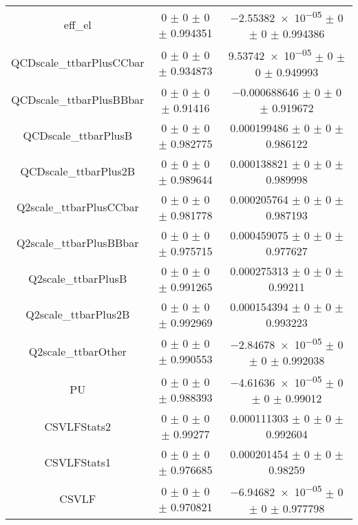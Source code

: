 \begin{table}
\begin{tabular}{ccc}
eff\_el & \num{0} $\pm$ \num{0} $\pm$ \num{0} $\pm$ \num{0.994351} & \num{-2.55382e-05} $\pm$ \num{0} $\pm$ \num{0} $\pm$ \num{0.994386}\\
QCDscale\_ttbarPlusCCbar & \num{0} $\pm$ \num{0} $\pm$ \num{0} $\pm$ \num{0.934873} & \num{9.53742e-05} $\pm$ \num{0} $\pm$ \num{0} $\pm$ \num{0.949993}\\
QCDscale\_ttbarPlusBBbar & \num{0} $\pm$ \num{0} $\pm$ \num{0} $\pm$ \num{0.91416} & \num{-0.000688646} $\pm$ \num{0} $\pm$ \num{0} $\pm$ \num{0.919672}\\
QCDscale\_ttbarPlusB & \num{0} $\pm$ \num{0} $\pm$ \num{0} $\pm$ \num{0.982775} & \num{0.000199486} $\pm$ \num{0} $\pm$ \num{0} $\pm$ \num{0.986122}\\
QCDscale\_ttbarPlus2B & \num{0} $\pm$ \num{0} $\pm$ \num{0} $\pm$ \num{0.989644} & \num{0.000138821} $\pm$ \num{0} $\pm$ \num{0} $\pm$ \num{0.989998}\\
Q2scale\_ttbarPlusCCbar & \num{0} $\pm$ \num{0} $\pm$ \num{0} $\pm$ \num{0.981778} & \num{0.000205764} $\pm$ \num{0} $\pm$ \num{0} $\pm$ \num{0.987193}\\
Q2scale\_ttbarPlusBBbar & \num{0} $\pm$ \num{0} $\pm$ \num{0} $\pm$ \num{0.975715} & \num{0.000459075} $\pm$ \num{0} $\pm$ \num{0} $\pm$ \num{0.977627}\\
Q2scale\_ttbarPlusB & \num{0} $\pm$ \num{0} $\pm$ \num{0} $\pm$ \num{0.991265} & \num{0.000275313} $\pm$ \num{0} $\pm$ \num{0} $\pm$ \num{0.99211}\\
Q2scale\_ttbarPlus2B & \num{0} $\pm$ \num{0} $\pm$ \num{0} $\pm$ \num{0.992969} & \num{0.000154394} $\pm$ \num{0} $\pm$ \num{0} $\pm$ \num{0.993223}\\
Q2scale\_ttbarOther & \num{0} $\pm$ \num{0} $\pm$ \num{0} $\pm$ \num{0.990553} & \num{-2.84678e-05} $\pm$ \num{0} $\pm$ \num{0} $\pm$ \num{0.992038}\\
PU & \num{0} $\pm$ \num{0} $\pm$ \num{0} $\pm$ \num{0.988393} & \num{-4.61636e-05} $\pm$ \num{0} $\pm$ \num{0} $\pm$ \num{0.99012}\\
CSVLFStats2 & \num{0} $\pm$ \num{0} $\pm$ \num{0} $\pm$ \num{0.99277} & \num{0.000111303} $\pm$ \num{0} $\pm$ \num{0} $\pm$ \num{0.992604}\\
CSVLFStats1 & \num{0} $\pm$ \num{0} $\pm$ \num{0} $\pm$ \num{0.976685} & \num{0.000201454} $\pm$ \num{0} $\pm$ \num{0} $\pm$ \num{0.98259}\\
CSVLF & \num{0} $\pm$ \num{0} $\pm$ \num{0} $\pm$ \num{0.970821} & \num{-6.94682e-05} $\pm$ \num{0} $\pm$ \num{0} $\pm$ \num{0.977798}\\

\end{tabular}
\end{table}
